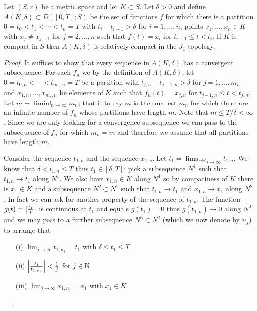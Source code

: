 \begin{lem}\label{SkorohodJ1CompactSetsOfStepFunctions}Let $(S,r)$ be a metric space and let $K \subset S$.  Let $\delta > 0$ and define
$A(K, \delta) \subset D([0,T];S)$ be the set of functions $f$ for which there is a partition
$0=t_0 < t_1 < \dotsb < t_n=T$ with $t_i-t_{i-1} >  \delta$ for $i=1, \dotsc, n$, points $x_1, \dotsc, x_n \in K$ with $x_j \neq x_{j-1}$ for $j=2, \dotsc, n$ such that $f(t) = x_i$ for $t_{i-1} \leq t < t_i$.  If $K$ is compact in $S$ then $A(K, \delta)$ is relatively compact in the $J_1$ topology.
\end{lem}
\begin{proof}
It suffices to show that every sequence in $A(K,\delta)$ has a convergent subsequence. 
For each $f_n$ we by the definition of $A(K,\delta)$, let $0=t_{0,n} < \dotsm < t_{m_n, n}=T$   be a partition with $t_{j,n}-t_{j-1,n}>\delta$ for $j=1, \dotsc, m_n$ and $x_{1, n}, \dotsc, x_{m_n, n}$ be elements of $K$ such that $f_n(t) = x_{j,n}$ for $t_{j-1,n} \leq t < t_{j,n}$.  Let $m = \liminf_{n \to \infty} m_n$; that is to say $m$ is the smallest $m_n$ for which there are an infinite number of $f_n$ whose partitions have length $m$.
Note that $m \leq T/\delta < \infty$.  Since we are only looking for a convergence subsequence we can pass to the subsequence of $f_n$ for which $m_n = m$ and therefore we assume that all partitions have length $m$.

Consider the sequence $t_{1,n}$ and the sequence $x_{1,n}$.  Let $t_1 = \limsup_{n \to \infty} t_{1,n}$.  We know that $\delta < t_{1,n} \leq T$ thus $t_1 \in [\delta,T]$; pick a subsequence $N^1$ such that $t_{1,n} \to t_1$ along $N^1$. 
We also have $x_{1,n} \in K$ along $N^1$ so by compactness of  $K$ there 
is $x_1 \in K$ and a subsequence $N^2 \subset N^1$ such that $t_{1,n} \to t_1$ and $x_{1,n} \to x_1$ along $N^2$.  
In fact we can ask for another property of the sequence of $t_{1,n}$.  The function $g(t) = \left \vert \frac{t_1}{t} \right \vert$ is continuous at $t_1$ 
and equals $g(t_1) = 0$ thus $g(t_{1,n}) \to 0$ along $N^2$ and we may pass to a further subsequence $N^3 \subset N^2$ (which we now
denote by $n_j$) to arrange that
\begin{itemize}
\item[(i)] $\lim_{j \to \infty} t_{1,n_j} = t_1$ with $\delta \leq t_1 \leq T$
\item[(ii)] $\left \vert \frac{t_1}{t_{1, n_j}} \right \vert < \frac{1}{j}$ for $j \in \mathbb{N}$
\item[(iii)] $\lim_{j \to \infty} x_{1,n_j} = x_1$ with $x_1 \in K$
\end{itemize}


\end{proof}
